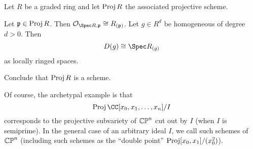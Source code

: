 \begin{theorem}
	Let $R$ be a graded ring and let $\operatorname{Proj} R$ the associated projective scheme.
	\begin{enumerate}[(a)]
		\ii Let $\mathfrak p \in \operatorname{Proj} R$.
		Then $\OO_{\Spec R, \pp} \cong R_{(\pp)}$.
		\ii Let $g \in R^d$ be homogeneous of degree $d > 0$. Then
		\[ D(g) \cong \Spec R_{(g)} \]
		as locally ringed spaces.
	\end{enumerate}
\end{theorem}
\begin{ques}
	Conclude that $\operatorname{Proj} R$ is a scheme.
\end{ques}

Of course, the archetypal example is that
\[ \Proj \CC[x_0, x_1, \dots, x_n] / I \]
corresponds to the projective subvariety of $\mathbb{CP}^n$
cut out by $I$ (when $I$ is semiprime).
In the general case of an arbitrary ideal $I$, we
call such schemes  of $\mathbb{CP}^n$
(including such schemes as the ``double point'' $\operatorname{Proj}[x_0,x_1]/(x_0^2)$).
